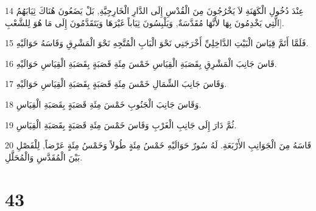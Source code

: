 \par 14 عِنْدَ دُخُولِ الْكَهَنَةِ لاَ يَخْرُجُونَ مِنَ الْقُدْسِ إِلَى الدَّارِ الْخَارِجِيَّةِ, بَلْ يَضَعُونَ هُنَاكَ ثِيَابَهُمُ الَّتِي يَخْدِمُونَ بِهَا لأَنَّهَا مُقَدَّسَةٌ, وَيَلْبِسُونَ ثِيَاباً غَيْرَهَا وَيَتَقَدَّمُونَ إِلَى مَا هُوَ لِلشَّعْبِ].
\par 15 فَلَمَّا أَتَمَّ قِيَاسَ الْبَيْتِ الدَّاخِلِيِّ أَخْرَجَنِي نَحْوَ الْبَابِ الْمُتَّجِهِ نَحْوَ الْمَشْرِقِ وَقَاسَهُ حَوَالَيْهِ.
\par 16 قَاسَ جَانِبَ الْمَشْرِقِ بِقَصَبَةِ الْقِيَاسِ خَمْسَ مِئَةِ قَصَبَةٍ بِقَصَبَةِ الْقِيَاسِ حَوَالَيْهِ.
\par 17 وَقَاسَ جَانِبَ الشِّمَالِ خَمْسَ مِئَةِ قَصَبَةٍ بِقَصَبَةِ الْقِيَاسِ حَوَالَيْهِ.
\par 18 وَقَاسَ جَانِبَ الْجَنُوبِ خَمْسَ مِئَةِ قَصَبَةٍ بِقَصَبَةِ الْقِيَاسِ.
\par 19 ثُمَّ دَارَ إِلَى جَانِبِ الْغَرْبِ وَقَاسَ خَمْسَ مِئَةِ قَصَبَةٍ بِقَصَبَةِ الْقِيَاسِ.
\par 20 قَاسَهُ مِنَ الْجَوَانِبِ الأَرْبَعَةِ. لَهُ سُورٌ حَوَالَيْهِ خَمْسُ مِئَةٍ طُولاً وَخَمْسُ مِئَةٍ عَرْضاً, لِلْفَصْلِ بَيْنَ الْمُقَدَّسِ وَالْمُحَلَّلِ.

\chapter{43}

